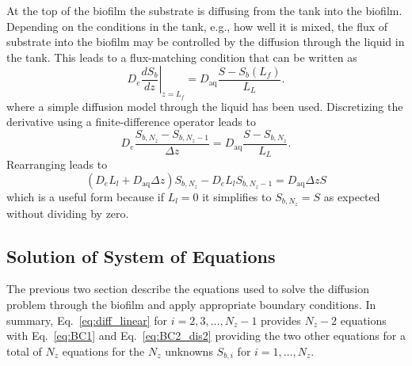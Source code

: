 \documentclass[letterpaper, twoside]{article}
\newcommand{\eg}{e.g.}
\begin{document}
At the top of the biofilm the substrate is diffusing from the tank into the biofilm.  Depending on the conditions in the tank, \eg, how well it is mixed, the flux of substrate into the biofilm may be controlled by the diffusion through the liquid in the tank.  This leads to a flux-matching condition that can be written as
\begin{equation}
  \label{eq:BC2}
  D_e \left.\frac{d S_b}{dz}\right|_{z=L_f} = D_{\mathrm{aq}} \frac{S - S_b(L_f)}{L_L}.
\end{equation}
where a simple diffusion model through the liquid has been used.  Discretizing the derivative using a finite-difference operator leads to
\begin{equation}
  \label{eq:BC2_dis}
  D_e \frac{S_{b,N_z} - S_{b,N_z-1}}{\Delta z} = D_{\mathrm{aq}} \frac{S - S_{b,N_z}}{L_L}.
\end{equation}
Rearranging leads to
\begin{equation}
  \label{eq:BC2_dis2}
  \left(D_e L_l + D_{\mathrm{aq}} \Delta z\right) S_{b,N_z} - D_e L_l S_{b,N_z-1} = D_{\mathrm{aq}} \Delta z S
\end{equation}
which is a useful form because if $L_l=0$ it simplifies to $S_{b,N_z}=S$ as expected without dividing by zero.

\subsection{Solution of System of Equations}
The previous two section describe the equations used to solve the diffusion problem through
the biofilm and apply appropriate boundary conditions.
In summary, Eq.~\ref{eq:diff_linear} for $i=2,3,\dots,N_z-1$ provides $N_z-2$ equations with
Eq.~\ref{eq:BC1} and Eq.~\ref{eq:BC2_dis2} providing the two other equations
for a total of $N_z$ equations for the $N_z$ unknowns $S_{b,i}$ for $i=1,\dots,N_z$.
\end{document}
